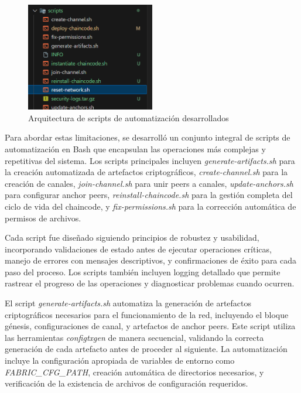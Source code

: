 \begin{figure}[H]
    \centering
    \includegraphics[width=0.50\textwidth]{figuras/arquitectura_scripts.png}
    \caption{Arquitectura de scripts de automatización desarrollados}
    \label{fig:arquitectura-scripts}
\end{figure}

Para abordar estas limitaciones, se desarrolló un conjunto integral de scripts de automatización en Bash que encapsulan las operaciones más complejas y repetitivas del sistema. Los scripts principales incluyen \textit{generate-artifacts.sh} para la creación automatizada de artefactos criptográficos, \textit{create-channel.sh} para la creación de canales, \textit{join-channel.sh} para unir peers a canales, \textit{update-anchors.sh} para configurar anchor peers, \textit{reinstall-chaincode.sh} para la gestión completa del ciclo de vida del chaincode, y \textit{fix-permissions.sh} para la corrección automática de permisos de archivos.

Cada script fue diseñado siguiendo principios de robustez y usabilidad, incorporando validaciones de estado antes de ejecutar operaciones críticas, manejo de errores con mensajes descriptivos, y confirmaciones de éxito para cada paso del proceso. Los scripts también incluyen logging detallado que permite rastrear el progreso de las operaciones y diagnosticar problemas cuando ocurren.


El script \textit{generate-artifacts.sh} automatiza la generación de artefactos criptográficos necesarios para el funcionamiento de la red, incluyendo el bloque génesis, configuraciones de canal, y artefactos de anchor peers. Este script utiliza las herramientas \textit{configtxgen} de manera secuencial, validando la correcta generación de cada artefacto antes de proceder al siguiente. La automatización incluye la configuración apropiada de variables de entorno como \textit{FABRIC\_CFG\_PATH}, creación automática de directorios necesarios, y verificación de la existencia de archivos de configuración requeridos.

